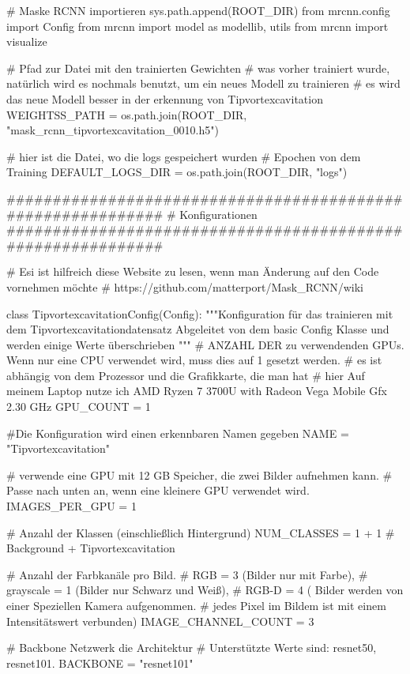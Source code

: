 # Maske RCNN importieren
sys.path.append(ROOT_DIR)  
from mrcnn.config import Config
from mrcnn import model as modellib, utils
from mrcnn import visualize

# Pfad zur Datei mit den trainierten Gewichten
# was vorher trainiert wurde, natürlich wird es nochmals benutzt, um ein neues Modell zu trainieren 
# es wird das neue Modell besser in der erkennung von Tipvortexcavitation
WEIGHTSS_PATH = os.path.join(ROOT_DIR, "mask_rcnn_tipvortexcavitation_0010.h5")

# hier ist die Datei, wo die logs gespeichert wurden 
# Epochen von dem Training 
DEFAULT_LOGS_DIR = os.path.join(ROOT_DIR, "logs")

############################################################
#  Konfigurationen
############################################################

# Esi ist hilfreich diese Website zu lesen, wenn man Änderung auf den Code vornehmen möchte 
#  https://github.com/matterport/Mask_RCNN/wiki


class TipvortexcavitationConfig(Config):
    """Konfiguration für das trainieren mit dem Tipvortexcavitationdatensatz
    Abgeleitet von dem basic Config Klasse und werden einige Werte überschrieben 
    """
    # ANZAHL DER zu verwendenden GPUs. Wenn nur eine CPU verwendet wird, muss dies auf 1 gesetzt werden.
    # es ist abhängig von dem Prozessor und die Grafikkarte, die man hat 
    # hier Auf meinem Laptop nutze ich AMD Ryzen 7 3700U with Radeon Vega Mobile Gfx 2.30 GHz
    GPU_COUNT = 1
    
    #Die Konfiguration wird einen erkennbaren Namen gegeben 
    NAME = "Tipvortexcavitation"

    # verwende eine GPU mit 12 GB Speicher, die zwei Bilder aufnehmen kann.
    # Passe nach unten an, wenn eine kleinere GPU verwendet wird.
    IMAGES_PER_GPU = 1

    # Anzahl der Klassen (einschließlich Hintergrund)
    NUM_CLASSES = 1 + 1  # Background + Tipvortexcavitation
    
    # Anzahl der Farbkanäle pro Bild.  
    # RGB = 3 (Bilder nur mit Farbe), 
    # grayscale = 1 (Bilder nur Schwarz und Weiß), 
    # RGB-D = 4 ( Bilder werden von einer Speziellen Kamera aufgenommen. 
    # jedes Pixel im Bildem ist mit einem Intensitätswert verbunden)
    IMAGE_CHANNEL_COUNT = 3
    
    
    # Backbone Netzwerk die Architektur
    # Unterstützte Werte sind: resnet50, resnet101.
    BACKBONE = "resnet101"

